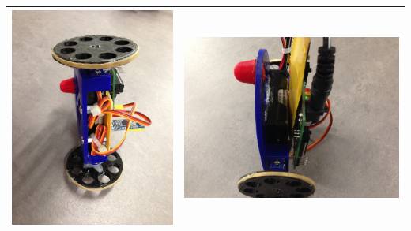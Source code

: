 \documentclass[]{article}
\begin{document}
\begin{longtable}[]{@{}ll@{}}
\includegraphics{front_view.jpg} &
\includegraphics{inside_view.jpg}\tabularnewline
\bottomrule
\end{longtable}
\end{document}
